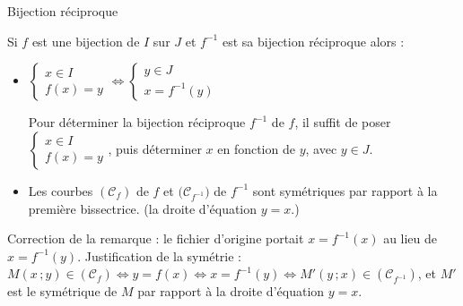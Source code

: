 \begin{acoller}{Bijection réciproque}
\begin{remark}
	Si $f$ est une bijection de $I$ sur $J$ et $f^{-1}$ est sa bijection réciproque alors :
	\begin{itemize}
		\item $\begin{cases}
			x\in I\\
			f(x)=y
		\end{cases}\iff \begin{cases}
		y\in J\\
		x=f^{-1}(y)
	\end{cases}$
\par Pour déterminer la bijection réciproque $f^{-1}$ de $f$, il suffit de poser $\begin{cases}
	x\in I\\
	f(x)=y
\end{cases}$, puis déterminer $x$ en fonction de $y$, avec $y\in J$.
\item Les courbes $(\mathcal{C}_f)$ de $f$ et $\big(\mathcal{C}_{f^{-1}}\big)$ de $f^{-1}$ sont symétriques par rapport à la première bissectrice. (la droite d'équation $y=x$.)
	\end{itemize}
\hspace*{4cm}	
\end{remark}
\end{acoller}
\begin{noteprof}
Correction de la remarque : le fichier d'origine portait $x=f^{-1}(x)$ au lieu de $x=f^{-1}(y)$. Justification de la symétrie : $M(x\,;y)\in(\mathcal{C}_f)\iff y=f(x)\iff x=f^{-1}(y)\iff M'(y\,;x)\in(\mathcal{C}_{f^{-1}})$, et $M'$ est le symétrique de $M$ par rapport à la droite d'équation $y=x$.
\end{noteprof}
